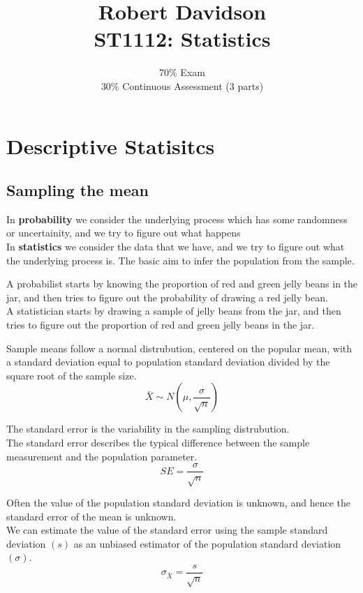 \documentclass[a4paper, 10pt]{article}
\title{
Robert Davidson \\
\textbf{ST1112: Statistics}
}
\author{
70\% Exam\\
30\% Continuous Assessment (3 parts)
}
\date{}       %
\begin{document}
\maketitle
\pagebreak



\tableofcontents
\pagebreak
\section{Descriptive Statisitcs}
\subsection{Sampling the mean}
In \textbf{probability} we consider the underlying process which has some randomness or uncertainity, and we try to figure out what happens \\[2ex]
In \textbf{statistics} we consider the data that we have, and we try to figure out what the underlying process is. The basic aim to infer the population from the sample.\\[2ex]
\begin{examplebox}
    A probabilist starts by knowing the proportion of red and green jelly beans in the jar, and then tries to figure out the probability of drawing a red jelly bean.\\
    A statistician starts by drawing a sample of jelly beans from the jar, and then tries to figure out the proportion of red and green jelly beans in the jar.
\end{examplebox}

\begin{definitionbox}
    Sample means follow a normal distrubution, centered on the popular mean, with a standard deviation equal to population standard deviation divided by the square root of the sample size.
    $$\bar{X} \sim N \left(\mu, \frac{\sigma}{\sqrt{n}}\right)$$
\end{definitionbox}

\begin{definitionbox}
    The standard error is the variability in the sampling distrubution. \\
    The standard error describes the typical difference between the sample measurement and the population parameter.\\
    $$SE = \frac{\sigma}{\sqrt{n}}$$
\end{definitionbox}
\begin{definitionbox}
    Often the value of the population standard deviation is unknown, and hence the standard error of the mean is unknown. \\
    We can estimate the value of the standard error using the sample standard deviation $(s)$ as an unbiased estimator of the population standard deviation $(\sigma)$.
    $$\sigma_{\bar{X}} = \frac{s}{\sqrt{n}}$$
\end{definitionbox}
\end{document}
